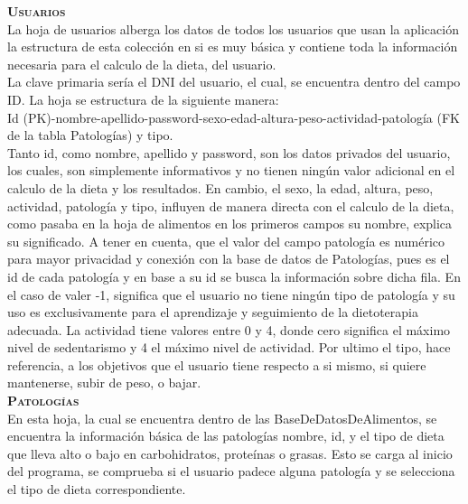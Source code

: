 \textbf{\textsc{Usuarios}}\\
La hoja de usuarios alberga los datos de todos los usuarios que usan la aplicación la estructura de esta colección en si es muy básica y contiene toda la información necesaria para el calculo de la dieta, del usuario.\\
La clave primaria sería el DNI del usuario, el cual, se encuentra dentro del campo ID. La hoja se estructura de la siguiente manera:\\
Id (PK)-nombre-apellido-password-sexo-edad-altura-peso-actividad-patología (FK de la tabla Patologías) y tipo.\\
Tanto id, como nombre, apellido y password, son los datos privados del usuario, los cuales, son simplemente informativos y no tienen ningún valor adicional en el calculo de la dieta y los resultados. En cambio, el sexo, la edad, altura, peso, actividad, patología y tipo, influyen de manera directa con el calculo de la dieta, como pasaba en la hoja de alimentos en los primeros campos su nombre, explica su significado. A tener en cuenta, que el valor del campo patología es numérico para mayor privacidad y conexión con la base de datos de Patologías, pues es el id de cada patología y en base a su id se busca la información sobre dicha fila. En el caso de valer -1, significa que el usuario no tiene ningún tipo de patología y su uso es exclusivamente para el aprendizaje y seguimiento de la dietoterapia adecuada. La actividad tiene valores entre 0 y 4, donde cero significa el máximo nivel de sedentarismo y 4 el máximo nivel de actividad. Por ultimo el tipo, hace referencia, a los objetivos que el usuario tiene respecto a si mismo, si quiere mantenerse, subir de peso, o bajar.\\

\textbf{\textsc{Patologías}}\\
En esta hoja, la cual se encuentra dentro de las BaseDeDatosDeAlimentos, se encuentra la información básica de las patologías nombre, id, y el tipo de dieta que lleva alto o bajo en carbohidratos, proteínas o grasas. Esto se carga al inicio del programa, se comprueba si el usuario padece alguna patología y se selecciona el tipo de dieta correspondiente.
